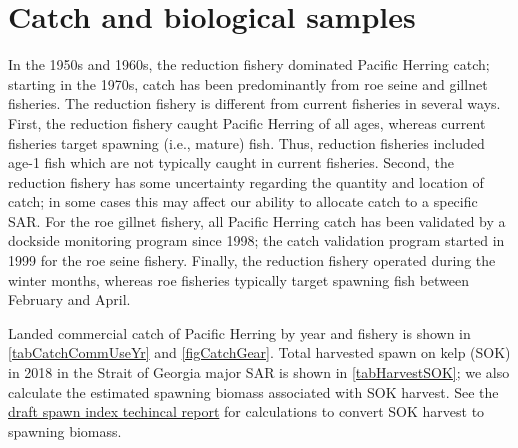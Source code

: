 \documentclass[12pt]{article}\usepackage[]{graphicx}\usepackage[]{color}
\newcommand{\regionName}{Strait of Georgia}
\newcommand{\regionType}{major}
\newcommand{\thisYr}{2018}
\newcommand{\fishName}{Pacific Herring}
\newcommand{\spawnIndexTechReport}{See the \href{https://github.com/grinnellm/HerringSpawnDocumentation/blob/master/SpawnIndexTechnicalReport.pdf}{draft spawn index techincal report} for calculations to convert SOK harvest to spawning biomass.}
\begin{document}



\section{Catch and biological samples}

In the 1950s and 1960s, the reduction fishery dominated \fishName{} catch; starting in the 1970s, catch has been predominantly from roe seine and gillnet fisheries.
The reduction fishery is different from current fisheries in several ways.
First, the reduction fishery caught \fishName{} of all ages, whereas current fisheries target spawning (i.e., mature) fish.
Thus, reduction fisheries included age-1 fish which are not typically caught in current fisheries.
Second, the reduction fishery has some uncertainty regarding the quantity and location of catch; in some cases this may affect our ability to allocate catch to a specific SAR.
For the roe gillnet fishery, all \fishName{} catch has been validated by a dockside monitoring program since 1998; the catch validation program started in 1999 for the roe seine fishery.
Finally, the reduction fishery operated during the winter months, whereas roe fisheries typically target spawning fish between February and April.

Landed commercial catch of \fishName{} by year and fishery is shown in \autoref{tabCatchCommUseYr} and \autoref{figCatchGear}.
\iftoggle{catchStatArea}{In addition to annual catch variability, catch varies among Statistical Areas (\autoref{figCatchStatArea}).}{\unskip}
Total harvested spawn on kelp (SOK) in \thisYr{} in the \regionName{} \regionType{} SAR is shown in \autoref{tabHarvestSOK}; we also calculate the estimated spawning biomass associated with SOK harvest.
\spawnIndexTechReport{}
\end{document}

